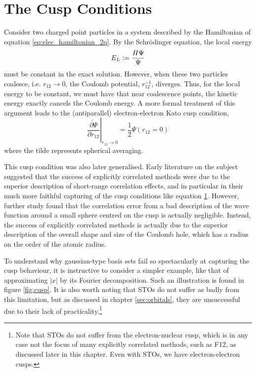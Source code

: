 \section{The Cusp Conditions}
\label{sec:cusp}

Consider two charged point particles in a system described by the Hamiltonian of equation \eqref{eq:elec_hamiltonian_2q}. By the Schr\"odinger equation, the local energy
\begin{equation}
    E_L\mathrel{\mathop:}= \frac{H\Psi}{\Psi}
\end{equation}
must be constant in the exact solution. However, when these two particles coalesce, i.e. $r_{12}\to 0$, the Coulomb potential, $r_{12}^{-1}$, diverges. Thus, for the local energy to be constant, we must have that near coalescence points, the kinetic energy exactly cancels the Coulomb energy. A more formal treatment of this argument leads to the (antiparallel) electron-electron Kato cusp condition,\cite{katoEigenfunctionsManyparticleSystems1957a}
\begin{equation}
    \label{eq:cusp}
    \left.\widetilde{\frac{\partial \Psi}{\partial r_{12}}}\right|_{r_{12}\to 0}
    = \frac 12 \Psi(r_{12}=0)
\end{equation}
where the tilde represents spherical averaging.

This cusp condition was also later generalised.\cite{packCuspConditionsMolecular1966,kurokawaChapterTwoGeneral2016}
Early literature on the subject suggested that the success of explicitly correlated methods were due to the superior description of short-range correlation effects, and in particular in their much more faithful capturing of the cusp conditions like equation \ref{sec:cusp}.\cite{roothaanAnalytical1960,watsonApproximate1960,weissConfiguration1961,schwartzGround1962}
However, further study found that the correlation error from a bad description of the wave function around a small sphere centred on the cusp is actually negligible.\cite{coulsonElectron1961,gilbertInterpretation1963,prendergastImpact2001,klopperR122007} Instead, the success of explicitly correlated methods is actually due to the superior description of the overall shape and size of the Coulomb hole, which has a radius on the order of the atomic radius.

To understand why gaussian-type basis sets fail so spectacularly at capturing the cusp behaviour, it is instructive to consider a simpler example, like that of approximating $|x|$ by its Fourier decomposition. Such an illustration is found in figure \ref{fig:cusp}. It is also worth noting that \glspl{STO} do not suffer as badly from this limitation,\cite{kongExplicitly2011} but as discussed in chapter \ref{sec:orbitals}, they are unsuccessful due to their lack of practicality.\footnote{Note that \glspl{STO} do not suffer from the electron-nuclear cusp, which is in any case not the focus of many explicitly correlated methods, such as F12, as discussed later in this chapter. Even with \glspl{STO}, we have electron-electron cusps.}

